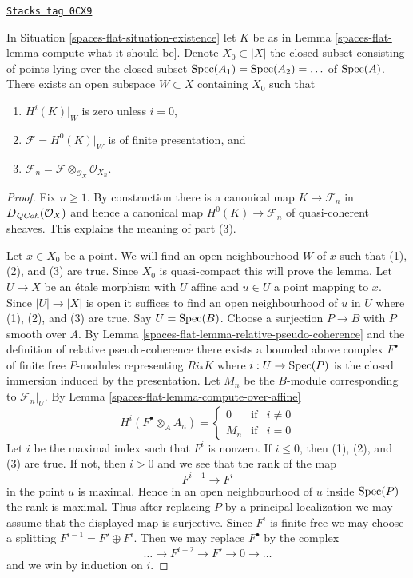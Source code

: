 \begin{lemma}
\label{spaces-flat-lemma-finitely-presented}
\href{https://stacks.math.columbia.edu/tag/0CX9}{\texttt{Stacks tag 0CX9}}

In Situation \ref{spaces-flat-situation-existence} let $K$ be as in
Lemma \ref{spaces-flat-lemma-compute-what-it-should-be}.
Denote $X_0 \subset |X|$ the closed subset
consisting of points lying over the closed subset
$\operatorname{Spec}(A_1) = \operatorname{Spec}(A_2) = \ldots$ of $\operatorname{Spec}(A)$.
There exists an open subspace $W \subset X$ containing $X_0$
such that
\begin{enumerate}
\item $H^i(K)|_W$ is zero unless $i = 0$,
\item $\mathcal{F} = H^0(K)|_W$ is of finite presentation, and
\item $\mathcal{F}_n = \mathcal{F} \otimes_{\mathcal{O}_X} \mathcal{O}_{X_n}$.
\end{enumerate}
\end{lemma}

\begin{proof}
Fix $n \geq 1$. By construction there is a canonical map
$K \to \mathcal{F}_n$ in $D_{\mathit{QCoh}}(\mathcal{O}_X)$
and hence a canonical map $H^0(K) \to \mathcal{F}_n$
of quasi-coherent sheaves. This explains the meaning of part (3).

\medskip\noindent
Let $x \in X_0$ be a point. We will find an open neighbourhood $W$
of $x$ such that (1), (2), and (3) are true. Since $X_0$ is quasi-compact
this will prove the lemma. Let $U \to X$ be an \'etale morphism
with $U$ affine and $u \in U$ a point mapping to $x$. Since $|U| \to |X|$
is open it suffices to find an open neighbourhood of $u$ in $U$
where (1), (2), and (3) are true. Say $U = \operatorname{Spec}(B)$.
Choose a surjection $P \to B$ with $P$ smooth over $A$.
By Lemma \ref{spaces-flat-lemma-relative-pseudo-coherence}
and the definition of relative pseudo-coherence
there exists a bounded above complex $F^\bullet$
of finite free $P$-modules representing
$Ri_*K$ where $i : U \to \operatorname{Spec}(P)$ is the closed
immersion induced by the presentation.
Let $M_n$ be the $B$-module corresponding to $\mathcal{F}_n|_U$.
By Lemma \ref{spaces-flat-lemma-compute-over-affine}
$$
H^i(F^\bullet \otimes_A A_n) =
\left\{
\begin{matrix}
0 & \text{if} & i \not = 0 \\
M_n & \text{if} & i = 0
\end{matrix}
\right.
$$
Let $i$ be the maximal index such that $F^i$ is nonzero.
If $i \leq 0$, then (1), (2), and (3) are true.
If not, then $i > 0$ and we see that the rank of the map
$$
F^{i - 1} \to F^i
$$
in the point $u$ is maximal. Hence in an open neighbourhood
of $u$ inside $\operatorname{Spec}(P)$ the rank is maximal. Thus after replacing
$P$ by a principal localization we may assume that the displayed
map is surjective. Since $F^i$ is finite free we may choose
a splitting $F^{i - 1} = F' \oplus F^i$. Then we may
replace $F^\bullet$ by the complex
$$
\ldots \to F^{i - 2} \to F' \to 0 \to \ldots
$$
and we win by induction on $i$.
\end{proof}

